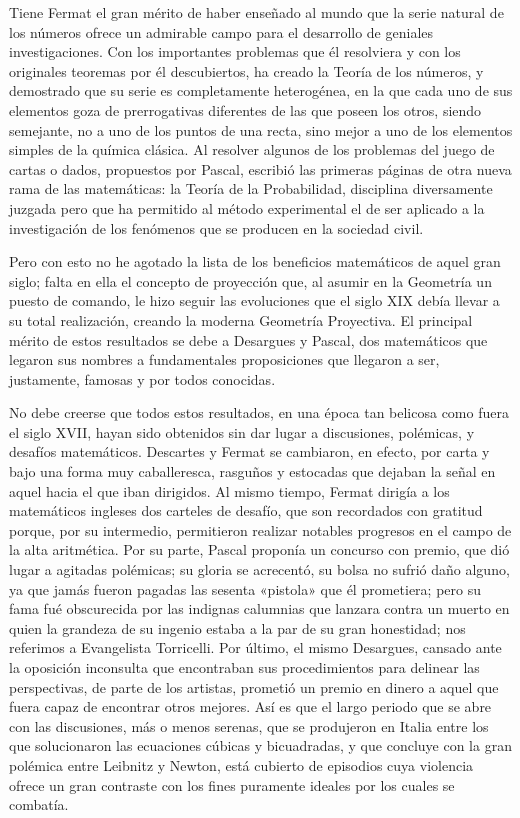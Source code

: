 \documentclass[a4paper, 12pt, draft]{article}
\begin{document}
{Tiene Fermat el gran mérito de haber enseñado al mundo que la serie natural de los números ofrece un admirable campo para el desarrollo de geniales investigaciones. Con los importantes problemas que él resolviera y con los originales teoremas por él descubiertos, ha creado la Teoría de los números, y demostrado que su serie es completamente heterogénea, en la que cada uno de sus elementos goza de prerrogativas diferentes de las que poseen los otros, siendo semejante, no a uno de los puntos de una recta, sino mejor a uno de los elementos simples de la química clásica. Al resolver algunos de los problemas del juego de cartas o dados, propuestos por Pascal, escribió las primeras páginas de otra nueva rama de las matemáticas: la Teoría de la Probabilidad, disciplina diversamente juzgada pero que ha permitido al método experimental el de ser aplicado a la investigación de los fenómenos que se producen en la sociedad civil.

Pero con esto no he agotado la lista de los beneficios matemáticos de aquel gran siglo; falta en ella el concepto de proyección que, al asumir en la Geometría un puesto de comando, le hizo seguir las evoluciones que el siglo XIX debía llevar a su total realización, creando la moderna Geometría Proyectiva. El principal mérito de estos resultados se debe a Desargues y Pascal, dos matemáticos que legaron sus nombres a fundamentales proposiciones que llegaron a ser, justamente, famosas y por todos conocidas.



No debe creerse que todos estos resultados, en una época tan belicosa como fuera el siglo XVII, hayan sido obtenidos sin dar lugar a discusiones, polémicas, y desafíos matemáticos. Descartes y Fermat se cambiaron, en efecto, por carta y bajo una forma muy caballeresca, rasguños y estocadas que dejaban la señal en aquel hacia el que iban dirigidos. Al mismo tiempo, Fermat dirigía a los matemáticos ingleses dos carteles de desafío, que son recordados con gratitud porque, por su intermedio, permitieron realizar notables progresos en el campo de la alta aritmética. Por su parte, Pascal proponía un concurso con premio, que dió lugar a agitadas polémicas; su gloria se acrecentó, su bolsa no sufrió daño alguno, ya que jamás fueron pagadas las sesenta «pistola» que él prometiera; pero su fama fué obscurecida por las indignas calumnias que lanzara contra un muerto en quien la grandeza de su ingenio estaba a la par de su gran honestidad; nos referimos a Evangelista Torricelli. Por último, el mismo Desargues, cansado ante la oposición inconsulta que encontraban sus procedimientos para delinear las perspectivas, de parte de los artistas, prometió un premio en dinero a aquel que fuera capaz de encontrar otros mejores. Así es que el largo periodo que se abre con las discusiones, más o menos serenas, que se produjeron en Italia entre los que solucionaron las ecuaciones cúbicas y bicuadradas, y que concluye con la gran polémica entre Leibnitz y Newton, está cubierto de episodios cuya violencia ofrece un gran contraste con los fines puramente ideales por los cuales se combatía.

}
\end{document}
